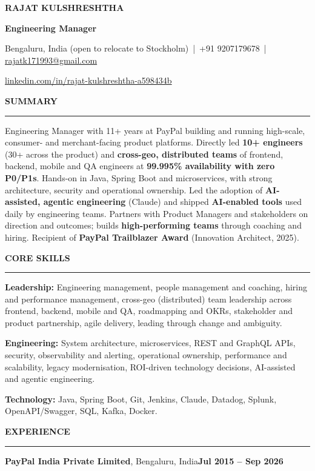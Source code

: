 \documentclass[10pt,a4paper]{article}
\renewcommand{\normalsize}{\fontsize{10}{12.1}\selectfont}
\newcommand{\bd}[1]{\textbf{#1}}
\newcommand{\sect}[1]{%
  \par\vspace{8pt}%
  {\bfseries\fontsize{10.8}{12.5}\selectfont #1}\par\nointerlineskip
  \vspace{1.5pt}\noindent\rule{\linewidth}{0.6pt}\par\vspace{4pt}}
\newcommand{\company}[3]{%
  \par\vspace{1pt}\noindent\textbf{#1}, #2\hfill\textbf{#3}\par\nopagebreak}
\begin{document}
\normalsize

\centerline{\bfseries\fontsize{17}{19}\selectfont RAJAT KULSHRESHTHA}
\vspace{2pt}
\centerline{\bfseries\fontsize{11}{13}\selectfont Engineering Manager}
\vspace{3pt}
\centerline{Bengaluru, India (open to relocate to Stockholm) \,|\, +91 9207179678 \,|\,
  \href{mailto:rajatk171993@gmail.com}{rajatk171993@gmail.com}}
\vspace{1.5pt}
\centerline{\href{https://www.linkedin.com/in/rajat-kulshreshtha-a598434b/}{linkedin.com/in/rajat-kulshreshtha-a598434b}}

\sect{SUMMARY}
Engineering Manager with 11+ years at PayPal building and running high-scale, consumer- and
merchant-facing product platforms. Directly led \bd{10+ engineers} (30+ across the product) and
\bd{cross-geo, distributed teams} of frontend, backend, mobile and QA engineers at
\bd{99.995\% availability with zero P0/P1s}.
Hands-on in Java, Spring Boot and microservices, with strong architecture, security and
operational ownership. Led the adoption of \bd{AI-assisted, agentic engineering} (Claude) and
shipped \bd{AI-enabled tools} used daily by engineering teams. Partners with Product Managers and
stakeholders on direction and outcomes; builds \bd{high-performing teams} through coaching and
hiring. Recipient of \bd{PayPal Trailblazer Award} (Innovation Architect, 2025).

\sect{CORE SKILLS}
\textbf{Leadership:} Engineering management, people management and coaching, hiring and
performance management, cross-geo (distributed) team leadership across frontend, backend,
mobile and QA, roadmapping and OKRs, stakeholder and
product partnership, agile delivery, leading through change and ambiguity.\par\vspace{2pt}
\textbf{Engineering:} System architecture, microservices, REST and GraphQL APIs, security,
observability and alerting, operational ownership, performance and scalability, legacy
modernisation, ROI-driven technology decisions, AI-assisted and agentic engineering.\par\vspace{2pt}
\textbf{Technology:} Java, Spring Boot, Git, Jenkins, Claude, Datadog, Splunk, OpenAPI/Swagger, SQL, Kafka, Docker.

\sect{EXPERIENCE}
\company{PayPal India Private Limited}{Bengaluru, India}{Jul 2015 -- Sep 2026}
\end{document}
